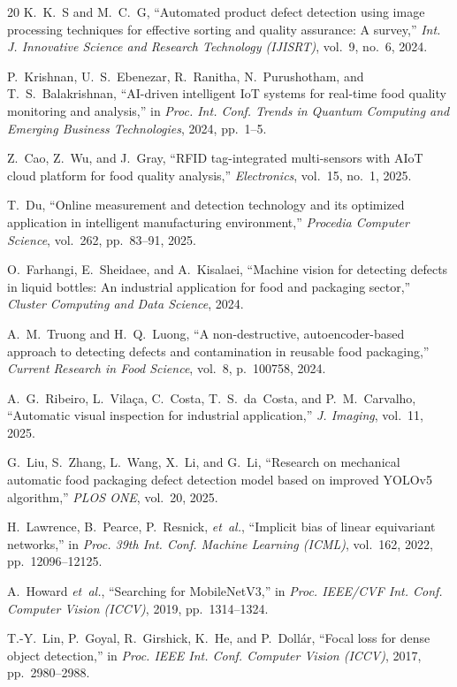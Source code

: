 \documentclass{ieeeaccess}
\begin{document}
\begin{thebibliography}{20}
K.~K.~S and M.~C.~G, ``Automated product defect detection using image processing techniques for effective sorting and quality assurance: A survey,'' \emph{Int. J. Innovative Science and Research Technology (IJISRT)}, vol.~9, no.~6, 2024.

P.~Krishnan, U.~S.~Ebenezar, R.~Ranitha, N.~Purushotham, and T.~S.~Balakrishnan, ``AI-driven intelligent IoT systems for real-time food quality monitoring and analysis,'' in \emph{Proc. Int. Conf. Trends in Quantum Computing and Emerging Business Technologies}, 2024, pp.~1--5.

Z.~Cao, Z.~Wu, and J.~Gray, ``RFID tag-integrated multi-sensors with AIoT cloud platform for food quality analysis,'' \emph{Electronics}, vol.~15, no.~1, 2025.

T.~Du, ``Online measurement and detection technology and its optimized application in intelligent manufacturing environment,'' \emph{Procedia Computer Science}, vol.~262, pp.~83--91, 2025.

O.~Farhangi, E.~Sheidaee, and A.~Kisalaei, ``Machine vision for detecting defects in liquid bottles: An industrial application for food and packaging sector,'' \emph{Cluster Computing and Data Science}, 2024.

A.~M.~Truong and H.~Q.~Luong, ``A non-destructive, autoencoder-based approach to detecting defects and contamination in reusable food packaging,'' \emph{Current Research in Food Science}, vol.~8, p.~100758, 2024.

A.~G.~Ribeiro, L.~Vila\c{c}a, C.~Costa, T.~S.~da~Costa, and P.~M.~Carvalho, ``Automatic visual inspection for industrial application,'' \emph{J. Imaging}, vol.~11, 2025.

G.~Liu, S.~Zhang, L.~Wang, X.~Li, and G.~Li, ``Research on mechanical automatic food packaging defect detection model based on improved YOLOv5 algorithm,'' \emph{PLOS ONE}, vol.~20, 2025.

H.~Lawrence, B.~Pearce, P.~Resnick, \emph{et~al.}, ``Implicit bias of linear equivariant networks,'' in \emph{Proc. 39th Int. Conf. Machine Learning (ICML)}, vol.~162, 2022, pp.~12096--12125.

A.~Howard \emph{et~al.}, ``Searching for MobileNetV3,'' in \emph{Proc. IEEE/CVF Int. Conf. Computer Vision (ICCV)}, 2019, pp.~1314--1324.

T.-Y.~Lin, P.~Goyal, R.~Girshick, K.~He, and P.~Doll\'{a}r, ``Focal loss for dense object detection,'' in \emph{Proc. IEEE Int. Conf. Computer Vision (ICCV)}, 2017, pp.~2980--2988.

\end{thebibliography}

\EOD
\end{document}
